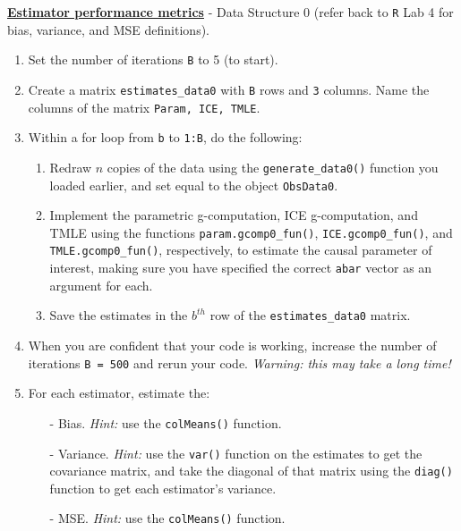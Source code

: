 \documentclass[answers]{exam}
\begin{document}
\noindent\textbf{\underline{Estimator performance metrics}} - Data Structure 0 (refer back to \texttt{R} Lab 4 for bias, variance, and MSE definitions).

\begin{enumerate}
\item Set the number of iterations \texttt{B} to 5 (to start).
\item Create a matrix \texttt{estimates\_data0} with \texttt{B} rows and \texttt{3} columns. Name the columns of the matrix \texttt{Param, ICE, TMLE}.
\item Within a for loop from \texttt{b} to \texttt{1:B}, do the following:
\begin{enumerate}
\item Redraw $n$ copies of the data using the \texttt{generate\_data0()} function you loaded earlier, and set equal to the object \texttt{ObsData0}. 
\item Implement the parametric g-computation, ICE g-computation, and TMLE using the functions \texttt{param.gcomp0\_fun()}, \texttt{ICE.gcomp0\_fun()}, and \texttt{TMLE.gcomp0\_fun()}, respectively, to estimate the causal parameter of interest, making sure you have specified the correct \texttt{abar} vector as an argument for each.
\item Save the estimates in the $b^{th}$ row of the \texttt{estimates\_data0} matrix.
\end{enumerate}
\item When you are confident that your code is working, increase the number of iterations \texttt{B = 500} and rerun your code. \textit{Warning: this may take a long time!}
\item For each estimator, estimate the:
\begin{itemize}
\item[-] Bias. \textit{Hint:} use the \texttt{colMeans()} function.
\item[-] Variance. \textit{Hint:} use the \texttt{var()} function on the estimates to get the covariance matrix, and take the diagonal of that matrix using the \texttt{diag()} function to get each estimator's variance.
\item[-] MSE. \textit{Hint:} use the \texttt{colMeans()} function.
\end{itemize}
\end{enumerate}
\end{document}
